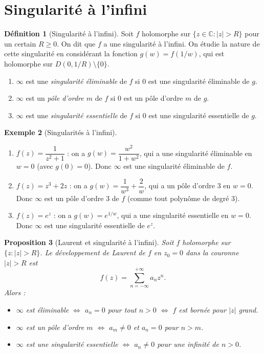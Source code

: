 \documentclass[12pt,a4paper,openany]{book}
\theoremstyle{definition}
\newtheorem{definition}{Définition}[chapter]
\newtheorem{exemple}[definition]{Exemple}
\theoremstyle{plain}
\newtheorem{proposition}[definition]{Proposition}
\theoremstyle{remark}
\newcommand{\C}{\mathbb{C}}
\newcommand{\abs}[1]{\left|#1\right|}
\begin{document}
\section{Singularité à l'infini}

\begin{definition}[Singularité à l'infini]\label{def:sing-infinity}
Soit $f$ holomorphe sur $\{z \in \C : \abs{z} > R\}$ pour un certain
$R \geq 0$. On dit que $f$ a une singularité à l'infini. On étudie
la nature de cette singularité en considérant la fonction
$g(w) = f(1/w)$, qui est holomorphe sur $D(0, 1/R)\setminus\{0\}$.
\begin{enumerate}[label=\textbf{(\roman*)}]
  \item $\infty$ est une \emph{singularité éliminable} de $f$ si $0$
        est une singularité éliminable de $g$.
  \item $\infty$ est un \emph{pôle d'ordre $m$} de $f$ si $0$ est un
        pôle d'ordre $m$ de $g$.
  \item $\infty$ est une \emph{singularité essentielle} de $f$ si $0$
        est une singularité essentielle de $g$.
\end{enumerate}
\end{definition}

\begin{exemple}[Singularités à l'infini]\label{ex:sing-infty}
\begin{enumerate}[label=\textbf{\alph*)}]
  \item $f(z) = \dfrac{1}{z^2+1}$ : on a $g(w) = \dfrac{w^2}{1+w^2}$,
        qui a une singularité éliminable en $w = 0$ (avec $g(0) = 0$).
        Donc $\infty$ est une singularité éliminable de $f$.
  \item $f(z) = z^3 + 2z$ : on a $g(w) = \dfrac{1}{w^3} + \dfrac{2}{w}$,
        qui a un pôle d'ordre $3$ en $w = 0$. Donc $\infty$ est un pôle
        d'ordre $3$ de $f$ (comme tout polynôme de degré $3$).
  \item $f(z) = e^z$ : on a $g(w) = e^{1/w}$, qui a une singularité
        essentielle en $w = 0$. Donc $\infty$ est une singularité
        essentielle de $e^z$.
\end{enumerate}
\end{exemple}

\begin{proposition}[Laurent et singularité à l'infini]\label{prop:laurent-infty}
Soit $f$ holomorphe sur $\{z : \abs{z} > R\}$. Le développement de
Laurent de $f$ en $z_0 = 0$ dans la couronne $\abs{z} > R$ est
\[
  f(z) = \sum_{n=-\infty}^{+\infty} a_n z^n.
\]
Alors :
\begin{itemize}
  \item $\infty$ est éliminable $\iff$ $a_n = 0$ pour tout $n > 0$
        $\iff$ $f$ est bornée pour $\abs{z}$ grand.
  \item $\infty$ est un pôle d'ordre $m$ $\iff$ $a_m \neq 0$ et
        $a_n = 0$ pour $n > m$.
  \item $\infty$ est une singularité essentielle $\iff$ $a_n \neq 0$
        pour une infinité de $n > 0$.
\end{itemize}
\end{proposition}
\end{document}
